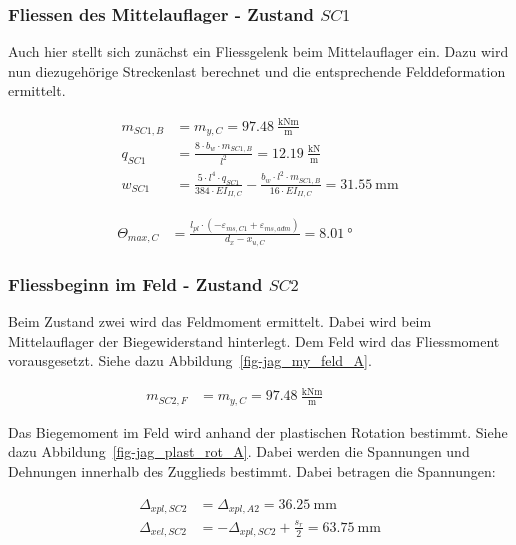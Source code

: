 \documentclass[
  11pt,
  letterpaper,
]{scrreprt}
\begin{document}
\subsubsection{\texorpdfstring{Fliessen des Mittelauflager - Zustand
\(SC1\)}{Fliessen des Mittelauflager - Zustand SC1}}\label{fliessen-des-mittelauflager---zustand-sc1}

Auch hier stellt sich zunächst ein Fliessgelenk beim Mittelauflager ein.
Dazu wird nun diezugehörige Streckenlast berechnet und die entsprechende
Felddeformation ermittelt.

\[
\begin{aligned}
m_{SC1 , B}& = m_{y , C} = 97.48 \ \frac{\mathrm{kNm}}{\mathrm{m}} \\ 
q_{SC1}& = \frac{8 \cdot b_{w} \cdot m_{SC1 , B}}{l^{2}} = 12.19 \ \frac{\mathrm{kN}}{\mathrm{m}} \\ 
w_{SC1}& = \frac{5 \cdot l^{4} \cdot q_{SC1}}{384 \cdot EI_{II , C}} - \frac{b_{w} \cdot l^{2} \cdot m_{SC1 , B}}{16 \cdot EI_{II , C}} = 31.55 \ \mathrm{mm} \end{aligned}
\]

\[
\begin{aligned}
\Theta_{max , C}& = \frac{l_{pl} \cdot \left(- \varepsilon_{m s , C1} + \varepsilon_{m s , adm}\right)}{d_{x} - x_{u , C}} = 8.01 \ \mathrm{°} \quad &  \quad &  
 \end{aligned}
\]

\subsubsection{\texorpdfstring{Fliessbeginn im Feld - Zustand
\(SC2\)}{Fliessbeginn im Feld - Zustand SC2}}\label{fliessbeginn-im-feld---zustand-sc2}

Beim Zustand zwei wird das Feldmoment ermittelt. Dabei wird beim
Mittelauflager der Biegewiderstand hinterlegt. Dem Feld wird das
Fliessmoment vorausgesetzt. Siehe dazu
Abbildung~\ref{fig-jag_my_feld_A}.

\[
\begin{aligned}
m_{SC2 , F}& = m_{y , C} = 97.48 \ \frac{\mathrm{kNm}}{\mathrm{m}} \quad &  \quad &  
 \end{aligned}
\]

Das Biegemoment im Feld wird anhand der plastischen Rotation bestimmt.
Siehe dazu Abbildung~\ref{fig-jag_plast_rot_A}. Dabei werden die
Spannungen und Dehnungen innerhalb des Zugglieds bestimmt. Dabei
betragen die Spannungen:

\[
\begin{aligned}
\Delta_{x pl , SC2}& = \Delta_{x pl , A2} = 36.25 \ \mathrm{mm} \\ 
\Delta_{x el , SC2}& = - \Delta_{x pl , SC2} + \frac{s_{r}}{2} = 63.75 \ \mathrm{mm} \end{aligned}
\]
\end{document}
